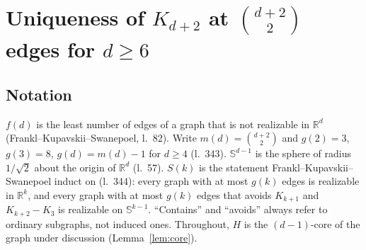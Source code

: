 %
%
%
%

\chapter{Uniqueness of $K_{d+2}$ at $\binom{d+2}{2}$ edges for $d \ge 6$}

\section{Notation}

$f(d)$ is the least number of edges of a graph that is not realizable in $\mathbb{R}^d$
(Frankl--Kupavskii--Swanepoel, l.~82). Write $m(d) = \binom{d+2}{2}$ and
$g(2) = 3$, $g(3) = 8$, $g(d) = m(d) - 1$ for $d \ge 4$ (l.~343). $\mathbb{S}^{d-1}$ is the
sphere of radius $1/\sqrt 2$ about the origin of $\mathbb{R}^d$ (l.~57). $S(k)$ is the
statement Frankl--Kupavskii--Swanepoel induct on (l.~344): every graph with at most $g(k)$
edges is realizable in $\mathbb{R}^k$, and every graph with at most $g(k)$ edges that avoids
$K_{k+1}$ and $K_{k+2} - K_3$ is realizable on $\mathbb{S}^{k-1}$. ``Contains'' and
``avoids'' always refer to ordinary subgraphs, not induced ones. Throughout,
$H$ is the $(d-1)$-core of the graph under discussion (Lemma~\ref{lem:core}).

